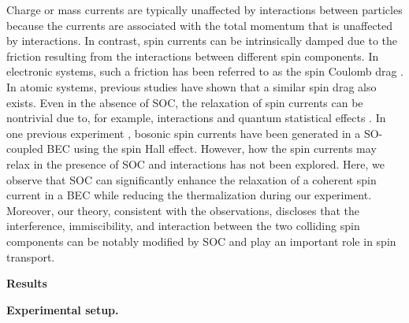 \documentclass[showpacs,preprintnumbers,amsmath,amssymb, superscriptaddress, aps, reprint]{revtex4-1}
\begin{document}
{Charge or mass currents are typically unaffected by interactions between particles 
because the currents are associated with the total momentum that is unaffected by interactions. In contrast, spin currents can be intrinsically damped due to the friction resulting from the interactions between different spin components. In electronic systems, such a friction has been referred to as the spin Coulomb drag \cite{Theory_SpinDrag_PhysRevB2000,Observation_spin_Col_drag_Nature2005}. In atomic systems, previous studies have shown that a similar spin drag \cite{SpinDrag_ThermalBose_PRL,Quant_Enhanc_spinDrag_NJP} also exists. Even in the absence of SOC, the relaxation of spin currents can be nontrivial due to, for example, interactions \cite{SpinDrag_Fermi_PRL,DampSDM_Fermi_PRL, SDM_Fermi_PhysRevA1999,Jin_SpinExc_PRL2001, Sommer_Nature_2011,Koschorreck_2013NatPhy} and quantum statistical effects \cite{DeMarco_SpinExc_PRL2002,Quant_Enhanc_spinDrag_NJP}. In one previous experiment \cite{Beeler_SHE_Nature_2013}, bosonic spin currents have been generated in a SO-coupled BEC using the spin Hall effect. However, how the spin currents may relax in the presence of SOC and interactions has not been explored. Here, we observe that SOC can significantly enhance the relaxation of a coherent spin current in a BEC while reducing the thermalization  during our experiment. Moreover, our theory, consistent with the observations, discloses that the interference, immiscibility, and interaction between the two colliding spin components can be notably modified by SOC and play an important role in spin transport. 




\begin{flushleft}
{\textbf{Results}}
\end{flushleft}


{\textbf{Experimental setup.}} 

}
\end{document}
